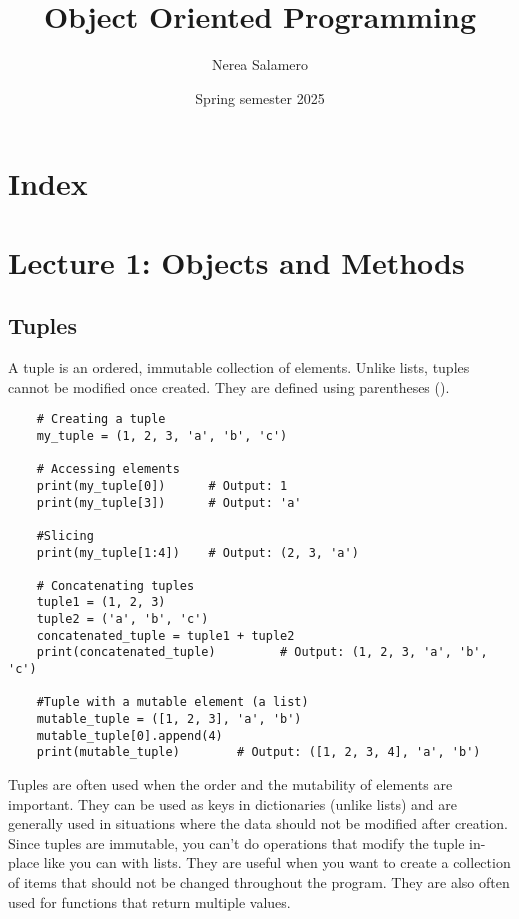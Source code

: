 \documentclass{article}
\title{Object Oriented Programming}
\author{Nerea Salamero}
\date{Spring semester 2025}
\begin{document}
\maketitle

\section{Index}

\section{Lecture 1: Objects and Methods}
\subsection{Tuples}
A tuple is an ordered, immutable collection of elements. Unlike lists, tuples cannot be modified once created. They are defined using parentheses ().
\begin{verbatim}
    # Creating a tuple
    my_tuple = (1, 2, 3, 'a', 'b', 'c')

    # Accessing elements
    print(my_tuple[0])      # Output: 1
    print(my_tuple[3])      # Output: 'a'
    
    #Slicing
    print(my_tuple[1:4])    # Output: (2, 3, 'a')
    
    # Concatenating tuples
    tuple1 = (1, 2, 3)
    tuple2 = ('a', 'b', 'c')
    concatenated_tuple = tuple1 + tuple2
    print(concatenated_tuple)         # Output: (1, 2, 3, 'a', 'b', 'c')
    
    #Tuple with a mutable element (a list)
    mutable_tuple = ([1, 2, 3], 'a', 'b')
    mutable_tuple[0].append(4)
    print(mutable_tuple)        # Output: ([1, 2, 3, 4], 'a', 'b')
\end{verbatim}
Tuples are often used when the order and the mutability of elements are important. They can be used as keys in dictionaries (unlike lists) and are generally used in situations where the data should not be modified after creation.
Since tuples are immutable, you can't do operations that modify the tuple in-place like you can with lists.
They are useful when you want to create a collection of items that should not be changed throughout the program. They are also often used for functions that return multiple values.
\end{document}
